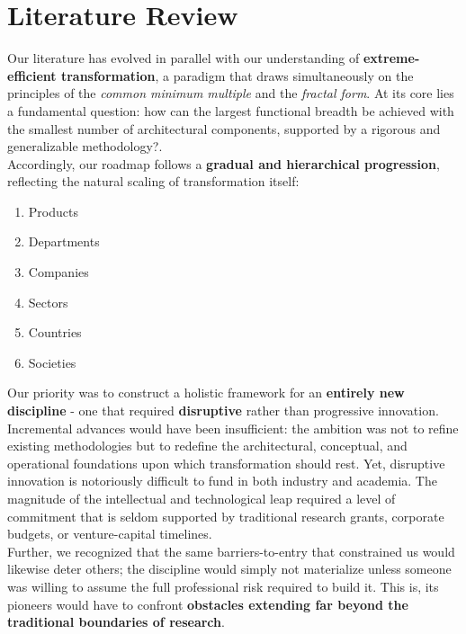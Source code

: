 \documentclass{article}
\begin{document}
\section{Literature Review}
\label{section: Literature Review}

Our literature has evolved in parallel with our understanding of \textbf{extreme-efficient transformation}, a paradigm that draws simultaneously on the principles of the \textit{common minimum multiple} and the \textit{fractal form}. At its core lies a fundamental question: how can the largest functional breadth be achieved with the smallest number of architectural components, supported by a rigorous and generalizable methodology?.\\

Accordingly, our roadmap follows a \textbf{gradual and hierarchical progression}, reflecting the natural scaling of transformation itself:
\begin{enumerate}
    \item Products
    \item Departments
    \item Companies
    \item Sectors
    \item Countries
    \item Societies
\end{enumerate}

Our priority was to construct a holistic framework for an \textbf{entirely new discipline} - one that required \textbf{disruptive} rather than progressive innovation. Incremental advances would have been insufficient: the ambition was not to refine existing methodologies but to redefine the architectural, conceptual, and operational foundations upon which transformation should rest. Yet, disruptive innovation is notoriously difficult to fund in both industry and academia. The magnitude of the intellectual and technological leap required a level of commitment that is seldom supported by traditional research grants, corporate budgets, or venture-capital timelines.\\

Further, we recognized that the same barriers-to-entry that constrained us would likewise deter others; the discipline would simply not materialize unless someone was willing to assume the full professional risk required to build it. This is, its pioneers would have to confront \textbf{obstacles extending far beyond the traditional boundaries of research}.\\
\end{document}

